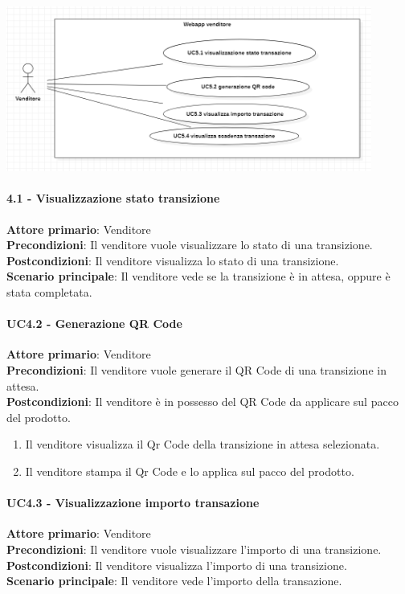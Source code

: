 \documentclass[a4paper, 12pt]{article}
\begin{document}
\includegraphics[width=0.9\textwidth]{UseCase_venditore4.png}

\paragraph{4.1 - Visualizzazione stato transizione}
\textbf{Attore primario}: Venditore\\
\textbf{Precondizioni}: Il venditore vuole visualizzare lo stato di una transizione.\\
\textbf{Postcondizioni}: Il venditore visualizza lo stato di una transizione.\\
\textbf{Scenario principale}: Il venditore vede se la transizione è in attesa, oppure è stata completata.\\

\paragraph{UC4.2 - Generazione QR Code}
\textbf{Attore primario}: Venditore\\
\textbf{Precondizioni}: Il venditore vuole generare il QR Code di una transizione in attesa.\\
\textbf{Postcondizioni}: Il venditore è in possesso del QR Code da applicare sul pacco del prodotto.\\
\begin{enumerate}
\item Il venditore visualizza il Qr Code della transizione in attesa selezionata.
\item Il venditore stampa il Qr Code e lo applica sul pacco del prodotto.
\end{enumerate}

\paragraph{UC4.3 - Visualizzazione importo transazione}
\textbf{Attore primario}: Venditore\\
\textbf{Precondizioni}: Il venditore vuole visualizzare l'importo di una transizione.\\
\textbf{Postcondizioni}: Il venditore visualizza l'importo di una transizione.\\
\textbf{Scenario principale}: Il venditore vede l'importo della transazione.\\
\end{document}
